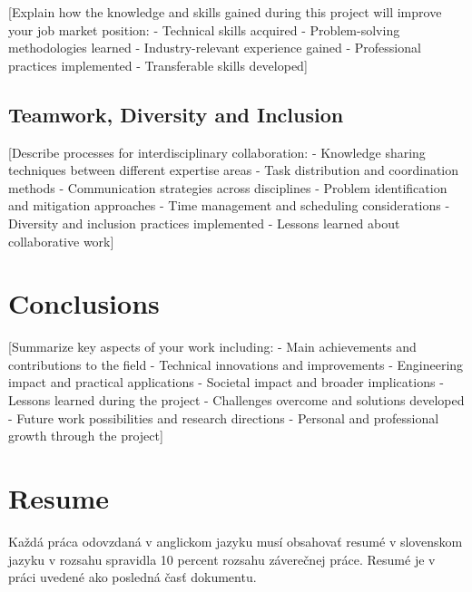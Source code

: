 \documentclass[11pt,a4paper,oneside]{book}
\begin{document}
[Explain how the knowledge and skills gained during this project will improve your job market position:
- Technical skills acquired
- Problem-solving methodologies learned
- Industry-relevant experience gained
- Professional practices implemented
- Transferable skills developed]

\section{Teamwork, Diversity and Inclusion}

[Describe processes for interdisciplinary collaboration:
- Knowledge sharing techniques between different expertise areas
- Task distribution and coordination methods
- Communication strategies across disciplines
- Problem identification and mitigation approaches
- Time management and scheduling considerations
- Diversity and inclusion practices implemented
- Lessons learned about collaborative work]

\chapter{Conclusions}

[Summarize key aspects of your work including:
- Main achievements and contributions to the field
- Technical innovations and improvements
- Engineering impact and practical applications
- Societal impact and broader implications
- Lessons learned during the project
- Challenges overcome and solutions developed
- Future work possibilities and research directions
- Personal and professional growth through the project]

\chapter{Resume}
Každá práca odovzdaná v anglickom jazyku musí obsahovať resumé v slovenskom jazyku v rozsahu spravidla 10 percent rozsahu záverečnej práce. Resumé je v práci uvedené ako posledná časť dokumentu.
\end{document}
